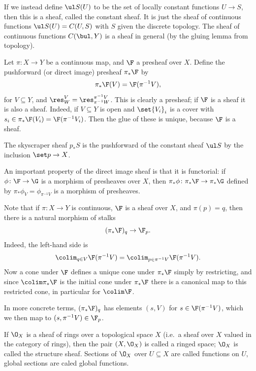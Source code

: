     If we instead define $\ul S(U)$ to be the set of locally constant functions $U\to S$, then this is a sheaf, called the {\emphcolor constant
    sheaf}.
    It is just the sheaf of continuous functions $\ul S(U)=C(U,S)$ with $S$ given the discrete topology.
    The sheaf of continuous functions $C(\bul,Y)$ is a sheaf in general (by the gluing lemma from topology).

\eexam

\bexam

    Let $\pi\colon X\to Y$ be a continuous map, and $\F$ a presheaf over $X$.
    Define the {\emphcolor pushforward} (or {\emphcolor direct image}) presheaf $\pi_*\F$ by
    $$ \pi_*\F(V) = \F(\pi^{-1}V), $$
    for $V\subseteq Y$, and $\res^V_W=\res^{\pi^{-1}V}_{\pi^{-1}W}$.
    This is clearly a presheaf; if $\F$ is a sheaf it is also a sheaf.
    Indeed, if $V\subseteq Y$ is open and $\set{V_i}_i$ is a cover with $s_i\in\pi_*\F(V_i)=\F(\pi^{-1}V_i)$.
    Then the glue of these is unique, because $\F$ is a sheaf.

    The skyscraper sheaf $p_*S$ is the pushforward of the constant sheaf $\ul S$ by the inclusion $\set p\to X$.

    An important property of the direct image sheaf is that it is functorial: if $\phi\colon\F\to\G$ is a morphism of presheaves over $X$,
    then $\pi_*\phi\colon\pi_*\F\to\pi_*\G$ defined by $\pi_*\phi_V=\phi_{\pi^{-1}V}$ is a morphism of presheaves.

\eexam

Note that if $\pi\colon X\to Y$ is continuous, $\F$ is a sheaf over $X$, and $\pi(p)=q$, then there is a natural morphism of stalks
$$ (\pi_*\F)_q \to \F_p . $$
Indeed, the left-hand side is
$$ \colim_{q\in V}\F(\pi^{-1}V) = \colim_{p\in\pi^{-1}V}\F(\pi^{-1}V) . $$
Now a cone under $\F$ defines a unique cone under $\pi_*\F$ simply by restricting, and since $\colim\pi_*\F$ is the initial cone under $\pi_*\F$
there is a canonical map to this restricted cone, in particular for $\colim\F$.

In more concrete terms, $(\pi_*\F)_q$ has elements $(s,V)$ for $s\in\F(\pi^{-1}V)$, which we then map to $(s,\pi^{-1}V)\in\F_p$.

\bdefn

    If $\O_X$ is a sheaf of rings over a topological space $X$ (i.e.\ a sheaf over $X$ valued in the category of rings), then the pair
    $(X,\O_X)$ is called a {\emphcolor ringed space}; $\O_X$ is called the {\emphcolor structure sheaf}.
    Sections of $\O_X$ over $U\subseteq X$ are called {\emphcolor functions} on $U$, global sections are caled {\emphcolor global functions}.

